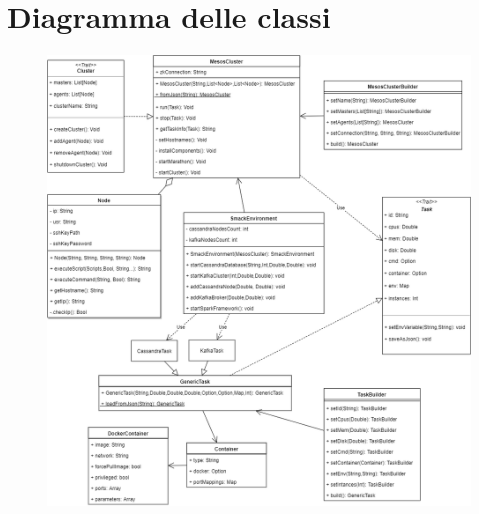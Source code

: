 \documentclass[12pt,a4paper]{article}
\begin{document}
    \section{Diagramma delle classi}\label{sec:diagrammaClassi}
    \begin{figure}[!h]
        \includegraphics[scale=0.5]{res/Class_Diagram_All.png}
    \end{figure}
    \restoregeometry
\end{document}
